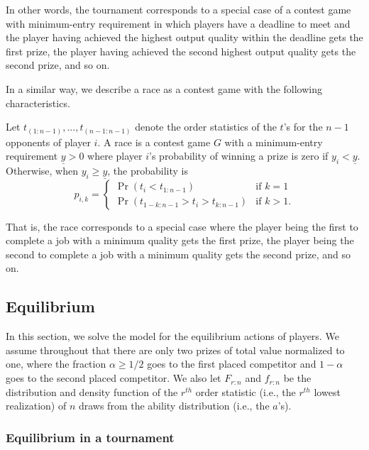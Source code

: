\documentclass[12pt,]{article}
\theoremstyle{plain} %
\newcommand\target{\underline{y}}
\begin{document}
In other words, the tournament corresponds to a special case of a
contest game with minimum-entry requirement in which players have a
deadline to meet and the player having achieved the highest output
quality within the deadline gets the first prize, the player having
achieved the second highest output quality gets the second prize, and so
on.

In a similar way, we describe a race as a contest game with the
following characteristics.

\begin{definition}[Race] Let $t_{(1:n-1)}, ..., t_{(n-1:n-1)}$ denote the order statistics of the $t$'s for the $n-1$ opponents of player $i$.  A race is a contest game $G$ with a minimum-entry requirement $\target>0$ where player $i$'s probability of winning a prize is zero if $y_i < \target$. Otherwise, when $y_i\geq \target$, the probability is
\begin{equation}
  p_{i, k} =
  \begin{cases}
    \Pr(t_i < t_{1:n-1}) & \text{if }k=1\\
    \Pr(t_{1-k:n-1} > t_i > t_{k:n-1}) & \text{if }k>1.
  \end{cases}
\end{equation}
\end{definition}

That is, the race corresponds to a special case where the player being
the first to complete a job with a minimum quality gets the first prize,
the player being the second to complete a job with a minimum quality
gets the second prize, and so on.

\subsection{Equilibrium}\label{equilibrium}

In this section, we solve the model for the equilibrium actions of
players. We assume throughout that there are only two prizes of total
value normalized to one, where the fraction \(\alpha\geq 1/2\) goes to
the first placed competitor and \(1-\alpha\) goes to the second placed
competitor. We also let \(F_{r:n}\) and \(f_{r:n}\) be the distribution
and density function of the \(r^{th}\) order statistic (i.e., the
\(r^{th}\) lowest realization) of \(n\) draws from the ability
distribution (i.e., the \(a\)'s).

\subsubsection{Equilibrium in a
tournament}\label{equilibrium-in-a-tournament}
\end{document}
